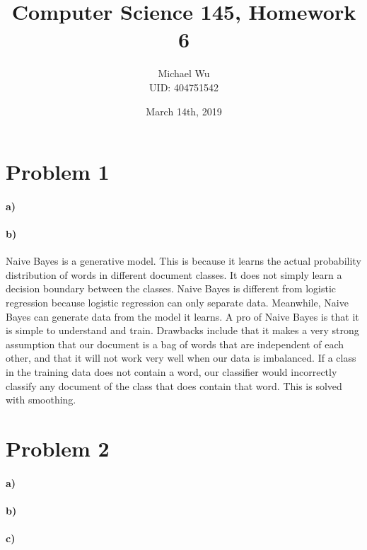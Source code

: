 \documentclass[12pt]{article}
\begin{document}
\title{Computer Science 145, Homework 6}
\date{March 14th, 2019}
\author{Michael Wu\\UID: 404751542}
\maketitle

\section*{Problem 1}

\paragraph{a)}

\paragraph{b)}

Naive Bayes is a generative model. This is because it learns the actual probability distribution of words in
different document classes. It does not simply learn a decision boundary between the classes. Naive Bayes
is different from logistic regression because logistic regression can only separate data. Meanwhile, Naive
Bayes can generate data from the model it learns. A pro of Naive Bayes is that it is simple to understand
and train. Drawbacks include that it makes a very strong assumption that our document is a bag of words
that are independent of each other, and that it will not work very well when our data is imbalanced. If
a class in the training data does not contain a word, our classifier would incorrectly classify any document
of the class that does contain that word. This is solved with smoothing.

\section*{Problem 2}

\paragraph{a)}

\paragraph{b)}

\paragraph{c)}
\end{document}
